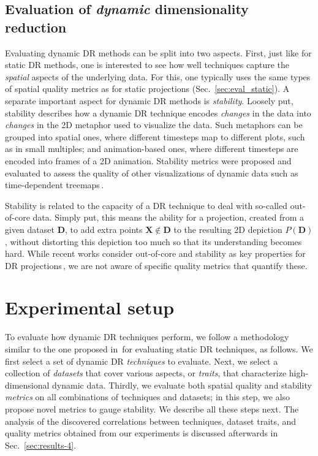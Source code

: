 \subsection{Evaluation of \textit{dynamic} dimensionality reduction}
\label{sec:eval_dynamic}
%
Evaluating dynamic DR methods can be split into two aspects. First, just like for static DR methods, one is interested to see how well techniques capture the \emph{spatial} aspects of the underlying data. For this, one typically uses the same types of spatial quality metrics as for static projections (Sec.~\ref{sec:eval_static}). A separate important aspect for dynamic DR methods is \emph{stability}. Loosely put, stability describes how a dynamic DR technique encodes \emph{changes} in the data into \emph{changes} in the 2D metaphor used to visualize the data. Such metaphors can be grouped into spatial ones, where different timesteps map to different plots, such as in small multiples; and animation-based ones, where different timesteps are encoded into frames of a 2D animation.
Stability metrics were proposed and evaluated to assess the quality of other visualizations of dynamic data such as time-dependent treemaps\,\cite{sondag17,vernier18git,vernier18software}.

Stability is related to the capacity of a DR technique to deal with so-called out-of-core data. Simply put, this means the ability for a projection, created from a given dataset $\mathbf{D}$, to add extra points $\mathbf{X} \notin \mathbf{D}$ to the resulting 2D depiction $P(\mathbf{D})$, without distorting this depiction too much so that its understanding becomes hard. While recent works consider out-of-core and stability as key properties for DR projections\,\cite{nonato_survey,Boytsov2017,MateusEspadoto,Garcia-fernandez2013,Buja2008}, we are not aware of specific quality metrics that quantify these.


\section{Experimental setup}
\label{sec:experiment}
%
To evaluate how dynamic DR techniques perform, we follow a methodology similar to the one proposed in\,\cite{EspadotoSurvey} for evaluating static DR techniques, as follows.
We first select a set of dynamic DR \emph{techniques} to evaluate. Next, we select a collection of \emph{datasets} that cover various aspects, or \emph{traits}, that characterize high-dimensional dynamic data. Thirdly, we evaluate both spatial quality and stability \emph{metrics} on all combinations of techniques and datasets; in this step, we also propose novel metrics to gauge stability. We describe all these steps next. The analysis of the discovered correlations between techniques, dataset traits, and quality metrics obtained from our experiments is discussed afterwards in Sec.~\ref{sec:results-4}.

